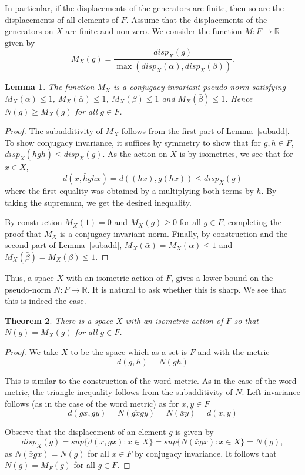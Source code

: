 \documentclass{amsart}
\theoremstyle{plain}
\newtheorem{theorem}{Theorem}[section]
\newtheorem{lemma}[theorem]{Lemma}
\theoremstyle{definition}
\theoremstyle{remark}
\newcommand{\R}{\mathbb{R}}
\renewcommand{\a}{\alpha}
\renewcommand{\b}{\beta}
\newcommand{\ba}{\bar{\alpha}}
\newcommand{\bb}{\bar{\beta}}
\begin{document}
In particular, if the displacements of the generators are finite, then so are the displacements of all elements of $F$. Assume that the displacements of the generators on $X$ are finite and non-zero. We consider the function $M:F\to \R$ given by
$$M_X(g)=\frac{disp_X(g)}{\max(disp_X(\a),disp_X(\b))}.$$

\begin{lemma}
The function $M_X$ is a conjugacy invariant  pseudo-norm  satisfying $M_X(\a)\leq 1$, $M_X(\ba)\leq 1$, $M_X(\b)\leq 1$ and $M_X(\bb)\leq 1$. Hence $N(g)\geq M_X(g)$ for all $g\in F$.
\end{lemma}
\begin{proof}
The subadditivity of $M_X$ follows from the first part of Lemma~\ref{subadd}. To show conjugacy invariance, it suffices by symmetry to show that for $g,h\in F$, $disp_X(\bar{h}gh)\leq disp_X(g)$. As the action on $X$ is by isometries, we see that for $x\in X$,
$$d(x,\bar{h}ghx)=d((hx),g(hx))\leq disp_X(g)$$
where the first equality was obtained by a multiplying both terms by $h$. By taking the supremum, we get the desired inequality.

By construction $M_X(1)=0$ and $M_X(g)\geq 0$ for all $g\in F$, completing the proof that $M_X$ is a conjugacy-invariant norm. Finally, by construction and the second part of Lemma~\ref{subadd}, $M_X(\ba)=M_X(\a)\leq 1$ and $M_X(\bb)=M_X(\b)\leq 1$.

\end{proof}

Thus, a space $X$ with an isometric action of $F$, gives a lower bound on the  pseudo-norm  $N:F\to \R$. It is natural to ask whether this is sharp. We see that this is indeed the case.

\begin{theorem}\label{sharp}
There is a space $X$ with an isometric action of $F$ so that $N(g)=M_X(g)$ for all $g\in F$.
\end{theorem} 
\begin{proof}
We take $X$ to be the space which as a set is $F$ and with the metric
$$d(g,h)=N(\bar{g}h)$$

This is similar to the construction of the word metric. As in the case of the word metric, the triangle inequality follows from the subadditivity of $N$. Left invariance follows (as in the case of the word metric) as for $x,y\in F$
$$d(gx,gy)=N(\overline{gx}gy)=N(\bar{x}y)=d(x,y)$$

Observe that the displacement of an element $g$ is given by
$$disp_X(g)= sup\{d(x,gx):x\in X\}=sup\{N(\bar{x}gx):x\in X\}=N(g),$$
as $N(\bar{x}gx)=N(g)$ for all $x\in F$ by conjugacy invariance. It follows that $N(g)=M_F(g)$ for all $g\in F$.
\end{proof}
\end{document}
